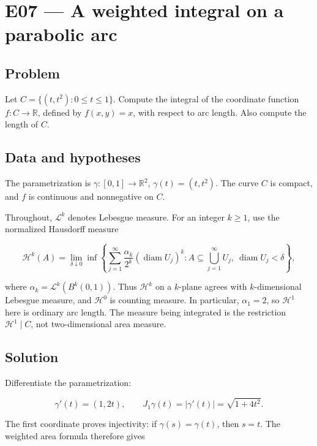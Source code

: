 \documentclass[
  11pt,
]{article}
\begin{document}
\section{E07 --- A weighted integral on a parabolic arc}\label{E07}

\subsection{Problem}\label{problem-6}

Let \(C=\{(t,t^2):0\leq t\leq1\}\). Compute the integral of the
coordinate function \(f:C\to\mathbb R\), defined by \(f(x,y)=x\), with
respect to arc length. Also compute the length of \(C\).

\subsection{Data and hypotheses}\label{data-and-hypotheses-6}

The parametrization is \(\gamma:[0,1]\to\mathbb R^2\),
\(\gamma(t)=(t,t^2)\). The curve \(C\) is compact, and \(f\) is
continuous and nonnegative on \(C\).

Throughout, \(\mathcal L^k\) denotes Lebesgue measure. For an integer
\(k\geq1\), use the normalized Hausdorff measure

\[
\mathcal H^k(A)=\lim_{\delta\downarrow0}\inf\left\{\sum_{j=1}^{\infty}\frac{\alpha_k}{2^k}(\operatorname{diam}U_j)^k:
A\subseteq\bigcup_{j=1}^{\infty}U_j,\ \operatorname{diam}U_j<\delta\right\},
\]

where \(\alpha_k=\mathcal L^k(B^k(0,1))\). Thus \(\mathcal H^k\) on a
\(k\)-plane agrees with \(k\)-dimensional Lebesgue measure, and
\(\mathcal H^0\) is counting measure. In particular, \(\alpha_1=2\), so
\(\mathcal H^1\) here is ordinary arc length. The measure being
integrated is the restriction \(\mathcal H^1\mathbin{\vert}C\), not
two-dimensional area measure.

\subsection{Solution}\label{solution-6}

Differentiate the parametrization:

\[
\gamma'(t)=(1,2t),\qquad J_1\gamma(t)=|\gamma'(t)|=\sqrt{1+4t^2}.
\]

The first coordinate proves injectivity: if \(\gamma(s)=\gamma(t)\),
then \(s=t\). The weighted area formula therefore gives
\end{document}
